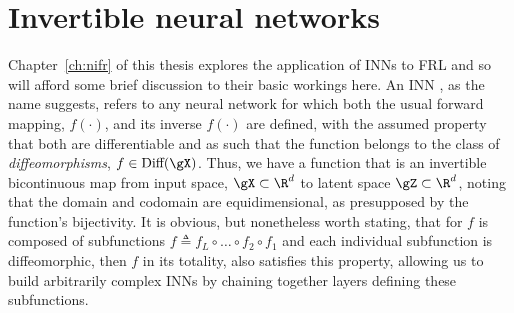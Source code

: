 \section{Invertible neural networks}\label{sec:inns}
%
%
Chapter~\ref{ch:nifr} of this thesis explores the application of \acp{INN} to \ac{FRL} and so will
afford some brief discussion to their basic workings here.
%
%
An \acl{INN} \citep{kobyzev2020normalizing}, as the name suggests, refers to any neural network for
which both the usual forward mapping, \(f(\cdot)\), and its inverse \(f(\cdot)\) are defined, with
the assumed property that both are differentiable and as such that the function belongs to the
class of \emph{diffeomorphisms}, \(f \in \text{Diff}(\gX)\). 
%
Thus, we have a function that is an invertible bicontinuous map from input space, \(\gX \subset
\R^d \) to latent space \(\gZ \subset \R^d \), noting that the domain and codomain are
equidimensional, as presupposed by the function's bijectivity.
%
It is obvious, but nonetheless worth stating, that for \(f\) is composed of subfunctions \(f
\triangleq f_L \circ \dots \circ f_2 \circ f_1\) and each individual subfunction is diffeomorphic,
then \(f\) in its totality, also satisfies this property, allowing us to build arbitrarily complex
\acp{INN} by chaining together layers defining these subfunctions.
%


